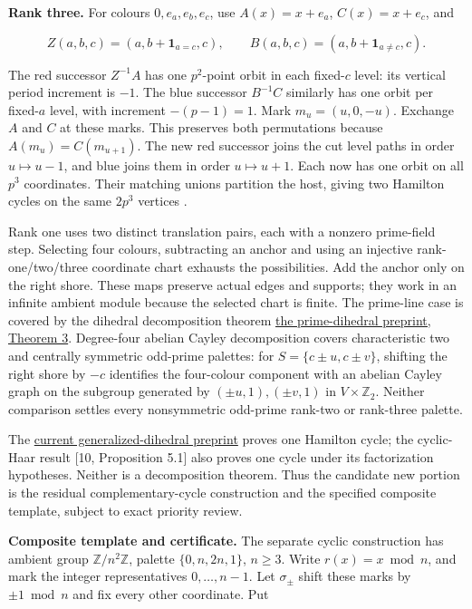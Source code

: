 \documentclass[smallextended]{svjour3}
\begin{document}
\textbf{Rank three.} For colours \(0,e_a,e_b,e_c\), use \(A(x)=x+e_a\),
\(C(x)=x+e_c\), and

\[
Z(a,b,c)=(a,b+\mathbf1_{a=c},c),\qquad
B(a,b,c)=(a,b+\mathbf1_{a\ne c},c).
\]

The red successor \(Z^{-1}A\) has one \(p^2\)-point orbit in each
fixed-\(c\) level: its vertical period increment is \(-1\). The blue
successor \(B^{-1}C\) similarly has one orbit per fixed-\(a\) level,
with increment \(-(p-1)=1\). Mark \(m_u=(u,0,-u)\). Exchange \(A\) and
\(C\) at these marks. This preserves both permutations because
\(A(m_u)=C(m_{u+1})\). The new red successor joins the cut level paths
in order \(u\mapsto u-1\), and blue joins them in order
\(u\mapsto u+1\). Each now has one orbit on all \(p^3\) coordinates.
Their matching unions partition the host, giving two Hamilton cycles on
the same \(2p^3\) vertices \cite{ref11}.

Rank one uses two distinct translation pairs, each with a nonzero
prime-field step. Selecting four colours, subtracting an anchor and
using an injective rank-one/two/three coordinate chart exhausts the
possibilities. Add the anchor only on the right shore. These maps
preserve actual edges and supports; they work in an infinite ambient
module because the selected chart is finite. The prime-line case is
covered by the dihedral decomposition theorem
\href{https://arxiv.org/html/1810.07866v1}{the prime-dihedral preprint,
Theorem 3}. Degree-four abelian Cayley decomposition \cite{ref6} covers
characteristic two and centrally symmetric odd-prime palettes: for
\(S=\{c\pm u,c\pm v\}\), shifting the right shore by \(-c\) identifies
the four-colour component with an abelian Cayley graph on the subgroup
generated by \((\pm u,1),(\pm v,1)\) in \(V\times\mathbb Z_2\). Neither
comparison settles every nonsymmetric odd-prime rank-two or rank-three
palette.

The \href{https://arxiv.org/html/1810.13311v3}{current
generalized-dihedral preprint} proves one Hamilton cycle; the
cyclic-Haar result {[}10, Proposition 5.1{]} also proves one cycle under
its factorization hypotheses. Neither is a decomposition theorem. Thus
the candidate new portion is the residual complementary-cycle
construction and the specified composite template, subject to exact
priority review.

\textbf{Composite template and certificate.} The separate cyclic
construction has ambient group \(\mathbb Z/n^2\mathbb Z\), palette
\(\{0,n,2n,1\}\), \(n\ge3\). Write \(r(x)=x\bmod n\), and mark the
integer representatives \(0,\ldots,n-1\). Let \(\sigma_\pm\) shift these
marks by \(\pm1\bmod n\) and fix every other coordinate. Put
\end{document}
